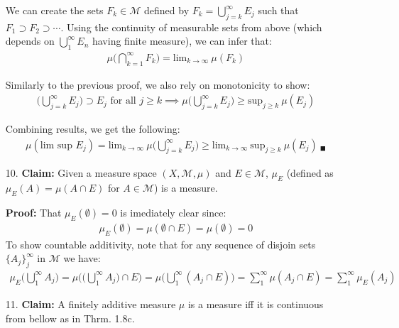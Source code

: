 \documentclass[11pt,letter]{article}
\begin{document}
\begin{enumerate}
    We can create the sets $F_k \in \mathcal{M}$ defined by $F_k = \bigcup_{j=k}^\infty E_j$ such that $F_1 \supset F_2 \supset \cdots$. Using the continuity of measurable sets from above (which depends on $\bigcup_{1}^\infty E_n$ having finite measure), we can infer that:
    \begin{align*}
        \mu \Big( \bigcap\limits_{k=1}^\infty F_k \Big) = \text{lim}_{k \rightarrow \infty} \ \mu(F_k)
    \end{align*}

    Similarly to the previous proof, we also rely on monotonicity to show:
    \begin{align*}
        \Big( \bigcup\limits_{j=k}^\infty E_j \Big) \supset E_j \text{ for all } j \ge k \implies \mu \Big( \bigcup\limits_{j=k}^\infty E_j \Big) \ge \text{sup}_{j \ge k} \ \mu(E_j)
    \end{align*}

    Combining results, we get the following:
    \begin{align*}
        \mu (\text{lim sup } E_j) = \text{lim}_{k \rightarrow \infty} \ \mu \Big( \bigcup\limits_{j=k}^\infty E_j \Big) \ge \text{lim}_{k \rightarrow \infty} \ \text{sup}_{j \ge k} \ \mu(E_j) \ _\blacksquare    
    \end{align*}

    \item[10.] \textbf{Claim:} Given a measure space $(X,\mathcal{M},\mu)$ and $E \in \mathcal{M}$, $\mu_E$ (defined as $\mu_E(A) = \mu(A \cap E)$ for $A \in \mathcal{M}$) is a measure.

    \textbf{Proof:} That $\mu_E(\emptyset) = 0$ is imediately clear since:
    \begin{align*}
        \mu_E(\emptyset) = \mu(\emptyset \cap E) = \mu(\emptyset) = 0
    \end{align*}
    To show countable additivity, note that for any sequence of disjoin sets $\{A_j\}_j^\infty$ in $\mathcal{M}$ we have:
    \begin{align*}
        \mu_E \Big(\bigcup\limits_1^\infty A_j \Big) = \mu \Big( \Big(\bigcup\limits_1^\infty A_j \Big) \cap E \Big) = \mu \Big(\bigcup\limits_1^\infty (A_j \cap E) \Big) = \sum\limits_1^\infty \mu (A_j \cap E) = \sum\limits_1^\infty \mu_E (A_j)
    \end{align*}

    \item[11.] \textbf{Claim:} A finitely additive measure $\mu$ is a measure iff it is continuous from bellow as in Thrm. 1.8c.


\end{enumerate}
\end{document}
